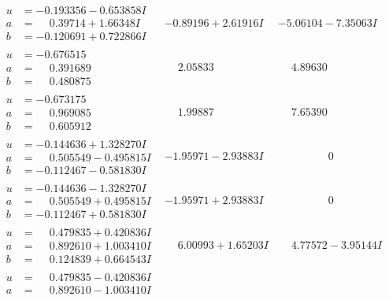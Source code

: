 \documentclass[1p]{elsarticle_modified}
\theoremstyle{definition}
\begin{document}
$$\begin{array}{c|c|c}
\begin{aligned}
u &= -0.193356 - 0.653858 I \\
a &= \phantom{-}0.39714 + 1.66348 I \\
b &= -0.120691 + 0.722866 I\end{aligned}
 & -0.89196 + 2.61916 I & -5.06104 - 7.35063 I \\ \hline\begin{aligned}
u &= -0.676515\phantom{ +0.000000I} \\
a &= \phantom{-}0.391689\phantom{ +0.000000I} \\
b &= \phantom{-}0.480875\phantom{ +0.000000I}\end{aligned}
 & \phantom{-}2.05833\phantom{ +0.000000I} & \phantom{-}4.89630\phantom{ +0.000000I} \\ \hline\begin{aligned}
u &= -0.673175\phantom{ +0.000000I} \\
a &= \phantom{-}0.969085\phantom{ +0.000000I} \\
b &= \phantom{-}0.605912\phantom{ +0.000000I}\end{aligned}
 & \phantom{-}1.99887\phantom{ +0.000000I} & \phantom{-}7.65390\phantom{ +0.000000I} \\ \hline\begin{aligned}
u &= -0.144636 + 1.328270 I \\
a &= \phantom{-}0.505549 - 0.495815 I \\
b &= -0.112467 - 0.581830 I\end{aligned}
 & -1.95971 - 2.93883 I & \phantom{-0.000000 } 0 \\ \hline\begin{aligned}
u &= -0.144636 - 1.328270 I \\
a &= \phantom{-}0.505549 + 0.495815 I \\
b &= -0.112467 + 0.581830 I\end{aligned}
 & -1.95971 + 2.93883 I & \phantom{-0.000000 } 0 \\ \hline\begin{aligned}
u &= \phantom{-}0.479835 + 0.420836 I \\
a &= \phantom{-}0.892610 + 1.003410 I \\
b &= \phantom{-}0.124839 + 0.664543 I\end{aligned}
 & \phantom{-}6.00993 + 1.65203 I & \phantom{-}4.77572 - 3.95144 I \\ \hline\begin{aligned}
u &= \phantom{-}0.479835 - 0.420836 I \\
a &= \phantom{-}0.892610 - 1.003410 I \\

\end{aligned}
\end{array}$$
\end{document}
